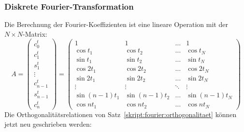 \subsubsection{Diskrete Fourier-Transformation}
Die Berechnung der Fourier-Koeffizienten ist eine lineare Operation
mit der $N\times N$-Matrix:
\[
A
=
\begin{pmatrix}
c_0^t\\
c_1^t\\
s_1^t\\
\vdots\\
c_{n-1}^t\\
s_{n-1}^t\\
c_n^t
\end{pmatrix}
=
\begin{pmatrix}
1           &1           &\dots &1            \\
\cos t_1    &\cos t_2    &\dots &\cos t_N     \\
\sin t_1    &\sin t_2    &\dots &\sin t_N     \\
\cos 2t_1   &\cos 2t_2   &\dots &\cos 2t_N    \\
\sin 2t_1   &\sin 2t_2   &\dots &\sin 2t_N    \\
\vdots      &\vdots      &\ddots&\vdots       \\
\sin(n-1)t_1&\sin(n-1)t_2&\dots &\sin(n-1)t_N \\
\cos nt_1   &\cos nt_2   &\dots &\cos nt_N    
\end{pmatrix}
\]
Die Orthogonalitätsrelationen von
Satz~\ref{skript:fourier:orthogonalitaet}
können jetzt neu geschrieben werden:
